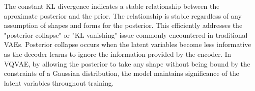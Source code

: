 The constant KL divergence indicates a stable relationship between the aproximate posterior and the prior. The relationship is stable regardless of any assumption of shapes and forms for the posterior. This efficiently
addresses the "posterior collapse" or "KL vanishing"\cite{posteriorcollapse} issue commonly encountered in traditional VAEs. Posterior collapse occurs when the latent variables become less informative as the decoder learns to ignore the information provided by the 
encoder. In VQVAE, by allowing the posterior to take any shape without being bound by the constraints of a Gaussian distribution, the model maintains significance of the latent variables throughout training. 
